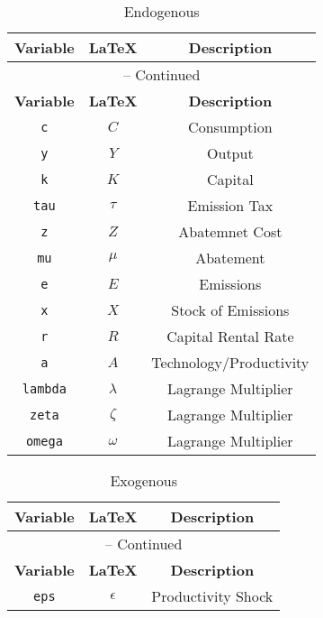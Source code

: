 \begin{center}
\begin{longtable}{ccc}
\caption{Endogenous}\\%
\hline%
\multicolumn{1}{c}{\textbf{Variable}} &
\multicolumn{1}{c}{\textbf{\LaTeX}} &
\multicolumn{1}{c}{\textbf{Description}}\\%
\hline\hline%
\endfirsthead
\multicolumn{3}{c}{{\tablename} \thetable{} -- Continued}\\%
\hline%
\multicolumn{1}{c}{\textbf{Variable}} &
\multicolumn{1}{c}{\textbf{\LaTeX}} &
\multicolumn{1}{c}{\textbf{Description}}\\%
\hline\hline%
\endhead
\texttt{c} & ${C}$ & Consumption\\
\texttt{y} & ${Y}$ & Output\\
\texttt{k} & ${K}$ & Capital\\
\texttt{tau} & ${\tau}$ & Emission Tax\\
\texttt{z} & ${Z}$ & Abatemnet Cost\\
\texttt{mu} & ${\mu}$ & Abatement\\
\texttt{e} & ${E}$ & Emissions\\
\texttt{x} & ${X}$ & Stock of Emissions\\
\texttt{r} & ${R}$ & Capital Rental Rate\\
\texttt{a} & ${A}$ & Technology/Productivity\\
\texttt{lambda} & ${\lambda}$ & Lagrange Multiplier\\
\texttt{zeta} & ${\zeta}$ & Lagrange Multiplier\\
\texttt{omega} & ${\omega}$ & Lagrange Multiplier\\
\hline%
\end{longtable}
\end{center}
\begin{center}
\begin{longtable}{ccc}
\caption{Exogenous}\\%
\hline%
\multicolumn{1}{c}{\textbf{Variable}} &
\multicolumn{1}{c}{\textbf{\LaTeX}} &
\multicolumn{1}{c}{\textbf{Description}}\\%
\hline\hline%
\endfirsthead
\multicolumn{3}{c}{{\tablename} \thetable{} -- Continued}\\%
\hline%
\multicolumn{1}{c}{\textbf{Variable}} &
\multicolumn{1}{c}{\textbf{\LaTeX}} &
\multicolumn{1}{c}{\textbf{Description}}\\%
\hline\hline%
\endhead
\texttt{eps} & $\epsilon$ & Productivity Shock\\
\hline%
\end{longtable}
\end{center}
